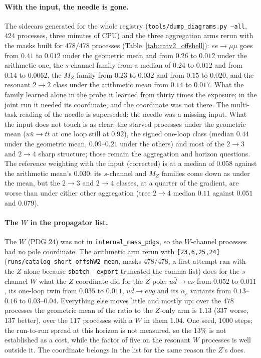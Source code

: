 \documentclass[11pt]{article}
\newcommand{\code}[1]{\texttt{#1}}
\begin{document}
\paragraph{With the input, the needle is gone.} The sidecars generated for the whole
registry (\code{tools/dump\_diagrams.py --all}, $424$ processes, three minutes of CPU) and
the three aggregation arms rerun with the masks built for $478/478$ processes
(Table~\ref{tab:catv2_offshell}): $ee\to\mu\mu$ goes from $0.41$ to $0.012$ under the
geometric mean and from $0.26$ to $0.012$ under the arithmetic one, the $s$-channel family
from a median of $0.24$ to $0.012$ and from $0.14$ to $0.0062$, the $M_Z$ family from $0.23$ to
$0.032$ and from $0.15$ to $0.020$, and the resonant $2\to2$ class under the arithmetic mean from
$0.14$ to $0.017$. What the family learned
alone in the probe it learned from thirty times the exposure; in the joint run it needed its
coordinate, and the coordinate was not there. The multi-task reading of the needle is
superseded: the needle was a missing input. What the input does not touch is as clear:
the starved processes under the geometric mean ($u\bar u\to t\bar t$ at one loop still at
$0.92$), the signed one-loop class (median $0.44$ under the geometric mean, $0.09$--$0.21$ under
the others) and most of the $2\to3$ and $2\to4$ sharp structure; those remain the
aggregation and horizon questions. The reference weighting with the input (corrected)
is at a median of $0.058$ against the arithmetic mean's $0.030$: its $s$-channel and $M_Z$
families come down as under the mean, but the $2\to3$ and $2\to4$ classes, at a quarter of the
gradient, are worse than under either other aggregation (tree $2\to4$ median $0.11$ against
$0.051$ and $0.079$).

\paragraph{The $W$ in the propagator list.} The $W$ (PDG $24$) was not in
\code{internal\_mass\_pdgs}, so the $W$-channel processes had no pole coordinate. The
arithmetic arm rerun with \code{[23,6,25,24]} (\code{runs/catalog\_short\_offshW2\_mean},
masks $478/478$; a first attempt ran with the $Z$ alone because \code{sbatch --export}
truncated the comma list) does for the $s$-channel $W$ what the $Z$ coordinate did for the
$Z$ pole: $u\bar d\to e\nu$ from $0.052$ to $0.011$, its one-loop twin from $0.035$ to
$0.011$, $u\bar d\to e\nu g$ and its $\alpha_s$ variants from $0.13$--$0.16$ to $0.03$--$0.04$.
Everything else moves little and mostly up: over the $478$ processes the geometric mean of
the ratio to the $Z$-only arm is $1.13$ ($337$ worse, $137$ better), over the $117$ processes with a $W$ in them $1.04$. One seed, $1000$ steps;
the run-to-run spread at this horizon is not measured, so the $13\%$ is not established as
a cost, while the factor of five on the resonant $W$ processes is well outside it. The
coordinate belongs in the list for the same reason the $Z$'s does.
\end{document}
